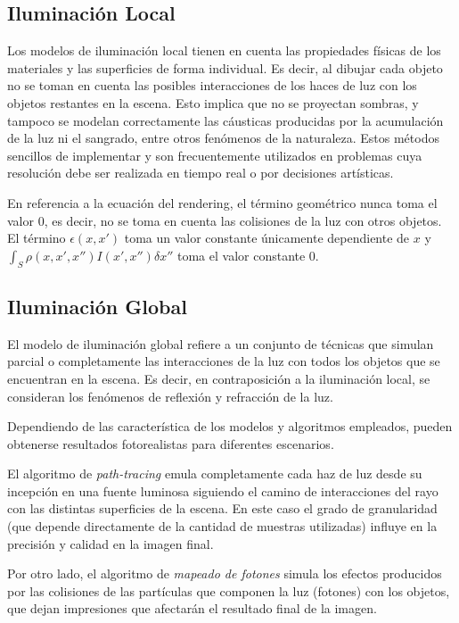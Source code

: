 \subsection{Iluminación Local}
\label{sec:ilumlocal}
Los modelos de iluminación local tienen en cuenta las propiedades físicas de los materiales
y las superficies de forma individual. Es decir, al dibujar cada objeto no se toman en cuenta las posibles interacciones de los haces de luz con los objetos restantes en la escena. Esto implica que no se proyectan sombras, y tampoco se modelan correctamente las cáusticas producidas por la acumulación de la luz ni el sangrado, entre otros fenómenos de la naturaleza. Estos métodos sencillos de implementar y son frecuentemente utilizados en problemas cuya resolución debe ser realizada en tiempo real o por decisiones artísticas.

En referencia a la ecuación del rendering, el término geométrico nunca toma el valor 0, es decir, no se toma en cuenta las colisiones de la luz con otros objetos. El término $\epsilon(x,x')$ toma un valor constante únicamente dependiente de $x$ y $\int_{S} \rho(x,x',x'')I(x',x'') \delta x''$ toma el valor constante $0$.

\subsection{Iluminación Global}
\label{sec:ilumglobal}

El modelo de iluminación global refiere a un conjunto de técnicas que simulan parcial o completamente las interacciones de la luz con todos los objetos que se encuentran  en la escena. Es decir, en contraposición a la iluminación local, se consideran los fenómenos de reflexión y refracción de la luz.

Dependiendo de las característica de los modelos y algoritmos empleados, pueden obtenerse resultados fotorealistas para diferentes escenarios.

El algoritmo de \textit{path-tracing} emula completamente cada haz de luz desde su incepción en una fuente luminosa siguiendo el camino de interacciones del rayo con las distintas superficies de la escena. En este caso el grado de granularidad (que depende directamente de la cantidad de muestras utilizadas) influye en la precisión y calidad en la imagen final.

Por otro lado, el algoritmo de \textit{mapeado de fotones} simula los efectos producidos por las colisiones de las partículas que componen la luz (fotones) con los objetos, que dejan impresiones que afectarán el resultado final de la imagen.

